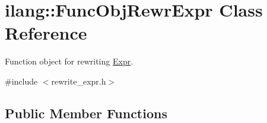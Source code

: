 \hypertarget{classilang_1_1_func_obj_rewr_expr}{}\section{ilang\+:\+:Func\+Obj\+Rewr\+Expr Class Reference}
\label{classilang_1_1_func_obj_rewr_expr}


Function object for rewriting \mbox{\hyperlink{classilang_1_1_expr}{Expr}}.  




{\ttfamily \#include $<$rewrite\+\_\+expr.\+h$>$}

\subsection*{Public Member Functions}
